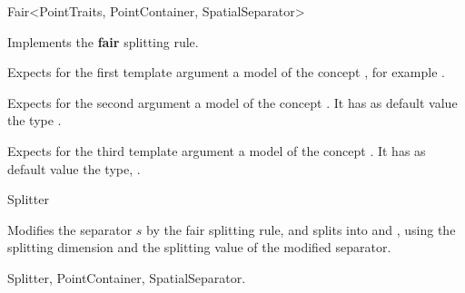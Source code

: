 

\begin{ccRefFunctionObjectClass}{Fair<PointTraits, PointContainer, SpatialSeparator>}  %


\ccDefinition
Implements the {\bf fair} splitting rule.  

\ccParameters

Expects for the first template argument a model of
the concept , 
for example . 

Expects for the second argument a model of the concept . 
It has as default value the type .

Expects for the third template argument a model of the concept . 
It has as default value the type, .


\ccInheritsFrom {}

\ccIsModel

Splitter

\ccTypes




\ccOperations

{Modifies the separator $s$ by the fair splitting rule, 
and splits  into  and ,
using the splitting dimension and the splitting value of the modified separator.}

\ccSeeAlso

Splitter, PointContainer, SpatialSeparator.

\end{ccRefFunctionObjectClass}


